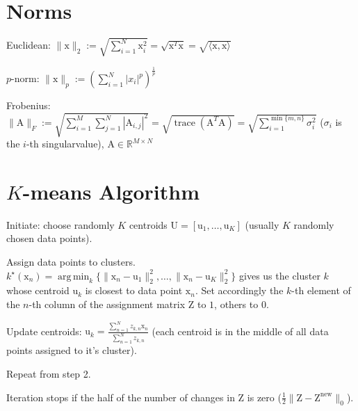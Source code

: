 \documentclass[a4paper, 11pt, landscape]{article}
\newcommand{\matr}[1]{\boldsymbol{\mathrm{#1}}}
\DeclareMathOperator*{\argmin}{arg\,min}
\begin{document}
\begin{multicols*}{3}
\section{Norms}
\begin{compactdesc}
	\item[Euclidean:] $\|\matr{x}\|_2 := \sqrt{\sum_{i=1}^{N} \matr{x}_i^2} = \sqrt{\matr{x}^T \matr{x}} = \sqrt{\langle \matr{x}, \matr{x} \rangle}$
	\item[$p$-norm:] $\|\matr{x}\|_p := \left( \sum_{i=1}^{N} |x_i|^p \right)^{\frac{1}{p}}$
	\item[Frobenius:] $\|\matr{A}\|_F :=\allowbreak \sqrt{\sum_{i=1}^{M} \sum_{j=1}^{N} |\matr{A}_{i, j}|^2} =\allowbreak \sqrt{\operatorname{trace}(\matr{A}^T \matr{A})} =\allowbreak \sqrt{\sum_{i=1}^{\min\{m, n\}} \sigma_i^2}$ ($\sigma_i$ is the $i$-th singularvalue), $\matr{A} \in \mathbb{R}^{M \times N}$
\end{compactdesc}

\section{$K$-means Algorithm}
\begin{compactenum}
	\item Initiate: choose randomly $K$ centroids $\matr{U} = [\matr{u}_1, \ldots, \matr{u}_K]$ (usually $K$ randomly chosen data points).
	\item Assign data points to clusters. $k^\star(\matr{x}_n) = \argmin_k \{ \|\matr{x}_n - \matr{u}_1\|_2^2, \ldots, \|\matr{x}_n - \matr{u}_K\|_2^2 \}$ gives us the cluster $k$ whose centroid $\matr{u}_k$ is closest to data point $\matr{x}_n$. Set accordingly the $k$-th element of the $n$-th column of the assignment matrix $\matr{Z}$ to $1$, others to $0$.
	\item Update centroids: $\matr{u}_k = \frac{\sum_{n=1}^N z_{k,n} \matr{x}_n}{\sum_{n=1}^N z_{k,n}}$ (each centroid is in the middle of all data points assigned to it's cluster).
	\item Repeat from step 2.
\end{compactenum}
Iteration stops if the half of the number of changes in $\matr{Z}$ is zero ($\frac{1}{2} \|\matr{Z} - \matr{Z}^\text{new}\|_0$).


\end{multicols*}
\end{document}
